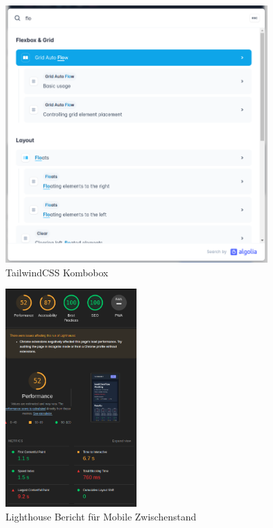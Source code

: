 \begin{figure}[th]
    \centering
    \includegraphics[width=0.9\textwidth]{Figures/cmdk_tailwindcss.png}
    \decoRule
    \caption[TailwindCSS Kombobox]{TailwindCSS Kombobox}
    \label{fig:cmdk_tailwindcss}
\end{figure}

\begin{figure}[th]
    \centering
    \includegraphics[width=0.45\textwidth]{Figures/lighthouse_mobile_1.png}
    \decoRule
    \caption[Turbomeet Lighthouse Bericht Mobile]{Lighthouse Bericht für Mobile Zwischenstand}
    \label{fig:lighthouse_mobile_1}
\end{figure}

